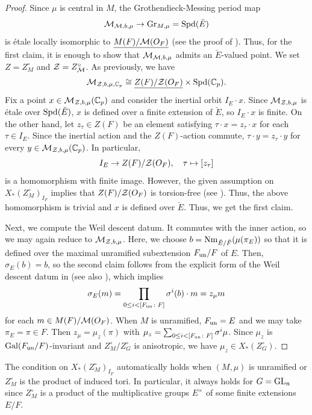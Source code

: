 \documentclass[12pt,reqno]{amsart}
\begin{document}
\begin{proof}
    Since $\mu$ is central in $M$, the Grothendieck-Messing period map
    \[
        {\mathcal{M}}_{{\mathcal{M}}, b, \mu} \to {\operatorname{Gr}}_{M, \mu} = {\operatorname{Spd}}(\breve{E})
    \]
    is \'{e}tale locally isomorphic to ${\underline{M(F) / {\mathcal{M}}(O_F)}}$ (see the proof of \cite[Proposition 23.3.3]{SW20}). Thus, for the first claim, it is enough to show that ${\mathcal{M}}_{{\mathcal{M}}, b, \mu}$ admits an $\breve{E}$-valued point. We set $Z = Z_M^\circ$ and ${\mathcal{Z}} = Z_{{\mathcal{M}}}^\circ$. As previously, we have 
    \[
        {\mathcal{M}}_{{\mathcal{Z}}, b, \mu, \mathbb{C}_p} \cong {\underline{Z(F) / {\mathcal{Z}}(O_F)}} \times {\operatorname{Spd}}(\mathbb{C}_p). 
    \]
    Fix a point $x \in {\mathcal{M}}_{{\mathcal{Z}}, b, \mu}(\mathbb{C}_p)$ and consider the inertial orbit $I_E \cdot x$. Since $ {\mathcal{M}}_{{\mathcal{Z}}, b, \mu}$ is \'{e}tale over ${\operatorname{Spd}}(\breve{E})$, $x$ is defined over a finite extension of $\breve{E}$, so $I_E \cdot x$ is finite. On the other hand, let $z_\tau \in Z(F)$ be an element satisfying $\tau \cdot x = z_\tau \cdot x$ for each $\tau \in I_E$. Since the inertial action and the $Z(F)$-action commute, $\tau \cdot y = z_\tau \cdot y$ for every $y \in {\mathcal{M}}_{{\mathcal{Z}}, b, \mu}(\mathbb{C}_p)$. In particular, 
    \[
        I_E \to Z(F) / {\mathcal{Z}}(O_F) ,\quad \tau \mapsto [z_\tau]
    \]
    is a homomorphism with finite image. However, the given assumption on $X_*(Z_M^\circ)_{I_F}$ implies that $Z(F) / {\mathcal{Z}}(O_F)$ is torsion-free (see \cite[Corollary 11.7.2]{KP23}). Thus, the above homomorphism is trivial and $x$ is defined over $\breve{E}$. Thus, we get the first claim. 

    Next, we compute the Weil descent datum. It commutes with the inner action, so we may again reduce to ${\mathcal{M}}_{{\mathcal{Z}}, b, \mu}$. Here, we choose $b = {\operatorname{Nm}}_{\breve{E} / \breve{F}}(\mu(\pi_E))$ so that it is defined over the maximal unramified subextension $F_{\operatorname{un}} / F$ of $E$. Then, $\sigma_E(b) = b$, so the second claim follows from the explicit form of the Weil descent datum in \cite[(3.1.6)]{PR24} (see also \cite[Construction 5.10]{Tak25z}), which implies 
    \[
        \sigma_E(m) = \prod_{0 \leq i < [F_{\operatorname{un}} \colon F]} \sigma^i(b) \cdot m = z_\mu m
    \]
    for each $m \in M(F) / {\mathcal{M}}(O_F)$. When $M$ is unramified, $F_{\operatorname{un}} = E$ and we may take $\pi_E = \pi \in F$. Then $z_\mu = \mu_z(\pi)$ with $\mu_z = \sum_{0 \leq i < [F_{\operatorname{un}} \colon F]} \sigma^i \mu$. Since $\mu_z$ is ${\operatorname{Gal}}(F_{\operatorname{un}} / F)$-invariant and $Z_M^\circ / Z_G^\circ$ is anisotropic, we have $\mu_z \in X_*(Z_G^\circ)$. 
\end{proof}
\begin{rmk}
    The condition on $X_*(Z_M^\circ)_{I_F}$ automatically holds when $(M, \mu)$ is unramified or $Z_M^\circ$ is the product of induced tori. In particular, it always holds for $G = {\operatorname{GL}}_n$ since $Z_M^\circ$ is a product of the multiplicative groups $E^\times$ of some finite extensions $E / F$. 
\end{rmk}
\end{document}
